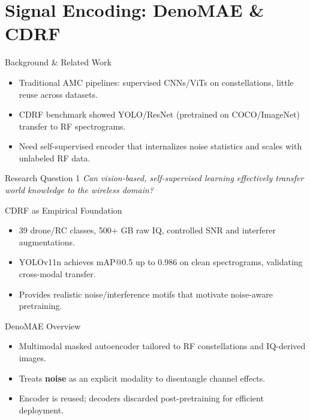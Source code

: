 \section{Signal Encoding: DenoMAE \& CDRF}

\begin{frame}{Background \& Related Work}
    \begin{itemize}
        \item Traditional AMC pipelines: supervised CNNs/ViTs on constellations, little reuse across datasets.
        \item CDRF benchmark showed YOLO/ResNet (pretrained on COCO/ImageNet) transfer to RF spectrograms.
        \item Need self-supervised encoder that internalizes noise statistics and scales with unlabeled RF data.
    \end{itemize}
\end{frame}

\begin{frame}{Research Question 1}
    \centering
    \Large
    \textit{Can vision-based, self-supervised learning effectively transfer world knowledge to the wireless domain?}
\end{frame}

\begin{frame}{CDRF as Empirical Foundation}
    \begin{itemize}
        \item 39 drone/RC classes, 500+ GB raw IQ, controlled SNR and interferer augmentations.
        \item YOLOv11n achieves mAP@0.5 up to 0.986 on clean spectrograms, validating cross-modal transfer.
        \item Provides realistic noise/interference motifs that motivate noise-aware pretraining.
    \end{itemize}
\end{frame}

\begin{frame}{DenoMAE Overview}
    \begin{itemize}
        \item Multimodal masked autoencoder tailored to RF constellations and IQ-derived images.
        \item Treats \textbf{noise} as an explicit modality to disentangle channel effects.
        \item Encoder is reused; decoders discarded post-pretraining for efficient deployment.
    \end{itemize}
\end{frame}

